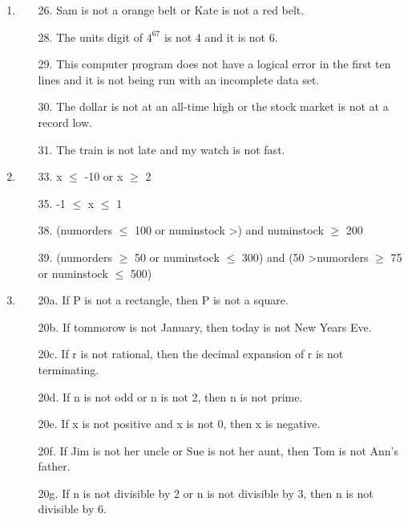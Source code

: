 \documentclass[12pt]{article}
\begin{document}
\begin{enumerate}[label = \alph*)]
    \item
        \begin{itemize}
            \item [26.] Sam is not a orange belt or Kate is not a red belt.
            \item [28.] The units digit of $4^{67}$ is not 4 and it is not 6.
            \item [29.] This computer program does not have a logical error in the first ten
                        lines and it is not being run with an incomplete data set.
            \item [30.] The dollar is not at an all-time high or the stock market is not at a
                        record low.
            \item [31.]  The train is not late and my watch is not fast.
        \end{itemize}
    \item 
        \begin{itemize}
            \item [33.] x $\leq$ -10 or x $\geq$ 2
            \item [35.] -1 $\leq$ x $\leq$ 1
            \item [38.] (num\textunderscore orders $\leq$ 100 or num\textunderscore instock \textgreater {}) and
                        num\textunderscore instock $\geq$ 200
            \item [39.] (num\textunderscore orders $\geq$ 50 or num\textunderscore instock $\leq$ 300) and
                        (50 \textgreater \space num\textunderscore orders $\geq$ 75 or num\textunderscore instock $\leq$ 500)
        \end{itemize}
    \vspace{1em}
    \item
        \begin{itemize}
            \item [20a.] If P is not a rectangle, then P is not a square.
            \item [20b.] If tommorow is not January, then today is not New Years Eve.
            \item [20c.] If r is not rational, then the decimal expansion of r is not terminating.
            \item [20d.] If n is not odd or n is not 2, then n is not prime.
            \item [20e.] If x is not positive and x is not 0, then x is negative.
            \item [20f.] If Jim is not her uncle or Sue is not her aunt, then Tom is not Ann's father.
            \item [20g.] If n is not divisible by 2 or n is not divisible by 3, then n is not divisible by 6.
        \end{itemize}
\end{enumerate}
\end{document}
